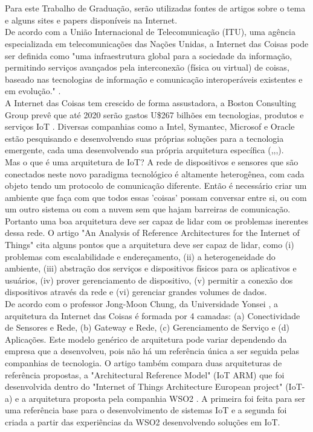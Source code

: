\documentclass[12pt, a4paper]{article}
\begin{document}
\section{\sectionII}
\label{sec:rev_Bib}

Para este Trabalho de Graduação, serão utilizadas fontes de artigos sobre o tema e alguns sites e papers disponíveis na Internet.\\
De acordo com a União Internacional de Telecomunicação (ITU), uma agência especializada em telecomunicações das Nações Unidas, a Internet das Coisas pode ser definida como "uma infraestrutura global para a sociedade da informação, permitindo serviços avançados pela interconexão (física ou virtual) de coisas, baseado nas tecnologias de informação e comunicação interoperáveis existentes e em evolução." \cite{ITU_IoT}.\\ 
A Internet das Coisas tem crescido de forma assustadora, a Boston Consulting Group prevê que até 2020 serão gastos U\$267 bilhões em tecnologias, produtos e serviços IoT \cite{Forbes_IoT}. Diversas companhias como a Intel, Symantec, Microsof e Oracle estão pesquisando e desenvolvendo suas próprias soluções para a tecnologia emergente, cada uma desenvolvendo sua própria arquitetura específica (\cite{Intel_Iot},\cite{Symantec_Iot},\cite{Microsoft_Iot},\cite{Oracle_IoT}).\\
Mas o que é uma arquitetura de IoT? A rede de dispositivos e sensores que são conectados neste novo paradigma tecnológico é altamente heterogênea, com cada objeto tendo um protocolo de comunicação diferente. Então é necessário criar um ambiente que faça com que todos essas 'coisas' possam conversar entre si, ou com um outro sistema ou com a nuvem sem que hajam barreiras de comunicação. Portanto uma boa arquitetura deve ser capaz de lidar com os problemas inerentes dessa rede. O artigo "An Analysis of Reference Architectures for the Internet of Things" \cite{Cavalcante:2015:ARA:2755567.2755569} cita alguns pontos que a arquitetura deve ser capaz de lidar, como (i) problemas com escalabilidade e endereçamento, (ii) a heterogeneidade do ambiente, (iii) abstração dos serviços e dispositivos físicos para os aplicativos e usuários, (iv) prover gerenciamento de dispositivo, (v) permitir a conexão dos dispositivos através da rede e (vi) gerenciar grandes volumes de dados.\\
De acordo com o professor Jong-Moon Chung, da Universidade Yonsei \cite{IoT_Coursera}, a arquitetura da Internet das Coisas é formada por 4 camadas: (a) Conectividade de Sensores e Rede, (b) Gateway e Rede, (c) Gerenciamento de Serviço e (d) Aplicações. Este modelo genérico de arquitetura pode variar dependendo da empresa que a desenvolveu, pois não há um referência única a ser seguida pelas companhias de tecnologia. O artigo \cite{Cavalcante:2015:ARA:2755567.2755569} também compara duas arquiteturas de referência propostas, a "Architectural Reference Model" (IoT ARM) \cite{IoTa_ref} que foi desenvolvida dentro do "Internet of Things Architecture European project" (IoT-a) e a arquitetura proposta pela companhia WSO2 \cite{WSO2_IoT}. A primeira foi feita para ser uma referência base para o desenvolvimento de sistemas IoT e a segunda foi criada a partir das experiências da WSO2 desenvolvendo soluções em IoT. \\
\end{document}
